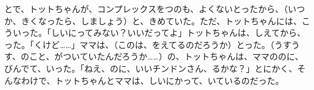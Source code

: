 とで、トットちゃんが、コンプレックスをつのも、よくないとったから、（いつか、きくなったら、しましょう）と、きめていた。ただ、トットちゃんには、こういった。「しいにってみない？いいだってよ」トットちゃんは、しえてから、った。「くけど……」ママは、（このは、をえてるのだろうか）とった。（うすうす、のこと、がついていたんだろうか……）の、トットちゃんは、ママののに、びんでて、いった。「ねえ、のに、いいチンドンさん、るかな？」とにかく、そんなわけで、トットちゃんとママは、しいにかって、いているのだった。


